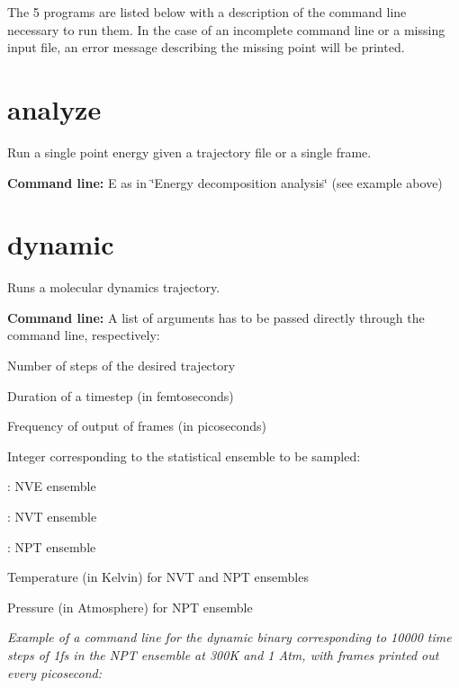 The 5 programs are listed below with a description of the command line necessary to run them. In the case of an incomplete command line or a missing input file, an error message describing the missing point will be printed.\hypertarget{tinker_hp_suite_program_analyze}{}\section{analyze}\label{tinker_hp_suite_program_analyze}
Run a single point energy given a trajectory file or a single frame.
\begin{DoxyItemize}
\item {\bfseries Command line\-:} {\ttfamily E} as in \char`\"{}\-Energy decomposition analysis\char`\"{} (see example above)
\end{DoxyItemize}\hypertarget{tinker_hp_suite_program_dynamic}{}\section{dynamic}\label{tinker_hp_suite_program_dynamic}
Runs a molecular dynamics trajectory.
\begin{DoxyItemize}
\item {\bfseries Command line\-:} A list of arguments has to be passed directly through the command line, respectively\-:
\begin{DoxyItemize}
\item Number of steps of the desired trajectory
\item Duration of a timestep (in femtoseconds)
\item Frequency of output of frames (in picoseconds)
\item Integer corresponding to the statistical ensemble to be sampled\-:
\begin{DoxyItemize}
\item {}\-: N\-V\-E ensemble
\item {}\-: N\-V\-T ensemble
\item {}\-: N\-P\-T ensemble
\end{DoxyItemize}
\item Temperature (in Kelvin) for N\-V\-T and N\-P\-T ensembles
\item Pressure (in Atmosphere) for N\-P\-T ensemble
\end{DoxyItemize}
\end{DoxyItemize}

{\itshape Example of a command line for the dynamic binary corresponding to 10000 time steps of 1fs in the N\-P\-T ensemble at 300\-K and 1 Atm, with frames printed out every picosecond\-:}


